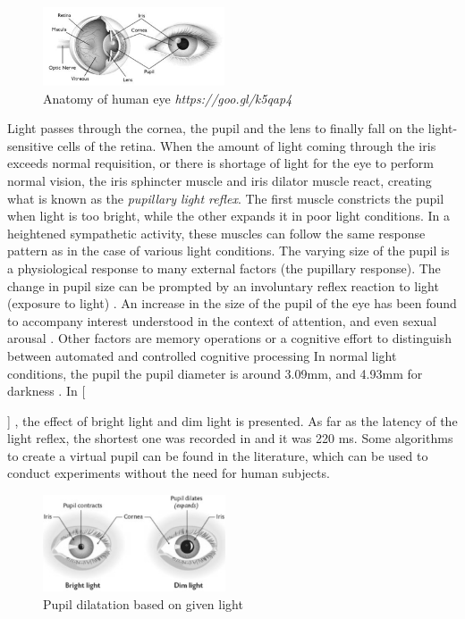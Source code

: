 \documentclass[USenglish,twocolumn]{article}
\newcommand{\Ref}[2]{%
    \IfEqCase{#1}{%
	    {fig}{Figure~\ref{#2}}%
	    {tab}{Table~\ref{#2}}%
	    {equ}{Equation~\ref{#2}}%
    }[\PackageError{tree}{Undefined option to tree: #1}{}]%
}%
\begin{document}
\begin{figure}[ht!]
	\centering
	\includegraphics[width=0.48\textwidth]{img/anatomy.png}
	\caption{Anatomy of human eye \textit{https://goo.gl/k5qap4}}
	\label{fig:anatomy}
\end{figure}
\indent Light passes through the cornea, the pupil and the lens to finally fall on the light-sensitive cells of the retina. When the amount of light coming through the iris exceeds normal requisition, or there is shortage of light for the eye to perform normal vision, the iris sphincter muscle and iris dilator muscle react, creating what is known as the \textit{pupillary light reflex}. The first muscle constricts the pupil when light is too bright, while the other expands it in poor light conditions. In a heightened sympathetic activity, these muscles can follow the same response pattern as in the case of various light conditions. The varying size of the pupil is a physiological response to many external factors (the pupillary response). The change in pupil size can be prompted by an involuntary reflex reaction to light (exposure to light) \cite{Saladin}. An increase in the size of the pupil of the eye has been found to accompany interest understood in the context of attention, and even sexual arousal \cite{Hess} \cite{Hammerer}. Other factors are memory operations \cite{Bradley} or a cognitive effort to distinguish between automated and controlled cognitive processing \cite{Querino} \cite{Staniucha} In normal light conditions, the pupil the pupil diameter is around 3.09mm, and 4.93mm for darkness \cite{Wyatt}. In \Ref{fig}{fig:dilatation}, the effect of bright light and dim light is presented. As far as the latency of the light reflex, the shortest one was recorded in \cite{Ellis} and it was 220 ms. Some algorithms to create a virtual pupil \cite{Walraven} can be found in the literature, which can be used to conduct experiments without the need for human subjects.
\begin{figure}[H]
	\centering
	\includegraphics[width=0.48\textwidth]{img/dilatation.png}
	\caption{Pupil dilatation based on given light \cite{Walker}}
	\label{fig:dilatation}
\end{figure}
\end{document}
